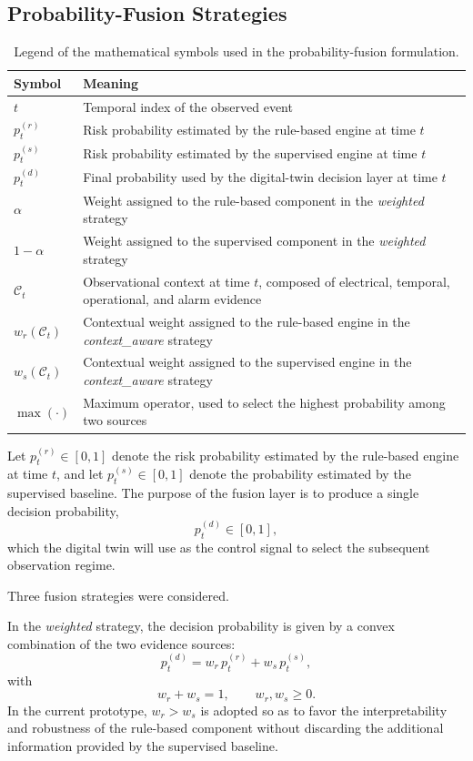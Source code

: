 \documentclass[journal]{IEEEtran}
\begin{document}
\subsection{Probability-Fusion Strategies} \label{subsec:fusao}
\begin{table}[ht]
\centering
\caption{Legend of the mathematical symbols used in the probability-fusion formulation.}
\label{tab:fusion_symbols}
\begin{tabular}{p{1.3cm} p{6.38cm}}
\hline
\textbf{Symbol} & \textbf{Meaning} \\
\hline
$t$ & Temporal index of the observed event \\
$p_t^{(r)}$ & Risk probability estimated by the rule-based engine at time $t$ \\
$p_t^{(s)}$ & Risk probability estimated by the supervised engine at time $t$ \\
$p_t^{(d)}$ & Final probability used by the digital-twin decision layer at time $t$ \\
$\alpha$ & Weight assigned to the rule-based component in the \textit{weighted} strategy \\
$1-\alpha$ & Weight assigned to the supervised component in the \textit{weighted} strategy \\
$\mathcal{C}_t$ & Observational context at time $t$, composed of electrical, temporal, operational, and alarm evidence \\
$w_r(\mathcal{C}_t)$ & Contextual weight assigned to the rule-based engine in the \textit{context\_aware} strategy \\
$w_s(\mathcal{C}_t)$ & Contextual weight assigned to the supervised engine in the \textit{context\_aware} strategy \\
$\max(\cdot)$ & Maximum operator, used to select the highest probability among two sources \\
\hline
\end{tabular}
\end{table}

Let $p_t^{(r)} \in [0,1]$ denote the risk probability estimated by the rule-based engine at time $t$, and let $p_t^{(s)} \in [0,1]$ denote the probability estimated by the supervised baseline. The purpose of the fusion layer is to produce a single decision probability,
\[
 p_t^{(d)} \in [0,1],
\]
which the digital twin will use as the control signal to select the subsequent observation regime.

Three fusion strategies were considered.

In the \textit{weighted} strategy, the decision probability is given by a convex combination of the two evidence sources:
\[
 p_t^{(d)} = w_r \, p_t^{(r)} + w_s \, p_t^{(s)},
\]
with
\[
 w_r + w_s = 1, \qquad w_r, w_s \geq 0.
\]
In the current prototype, $w_r > w_s$ is adopted so as to favor the interpretability and robustness of the rule-based component without discarding the additional information provided by the supervised baseline.
\end{document}
